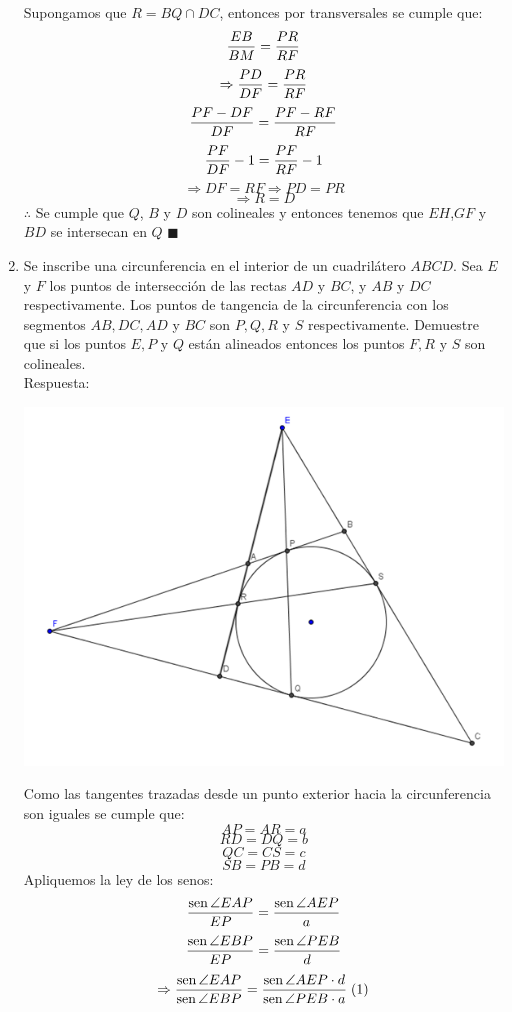 \documentclass{book}
\newcommand{\sen}{\mathop{\rm sen}\nolimits} %
\begin{document}
\begin{enumerate}
          Supongamos que $R=BQ\cap DC$, entonces por transversales se cumple que:
          $${EB\over BM}={PR\over RF}$$
          $$\Rightarrow{PD\over DF}={PR\over RF}$$
          $${PF-DF\over DF}={PF-RF\over RF}$$
          $${PF\over DF}-1={PF\over RF}-1$$
          $$\Rightarrow DF=RF\Rightarrow PD=PR$$
          $$\Rightarrow R=D$$
          $\therefore$ Se cumple que $Q$, $B$ y $D$ son colineales y entonces tenemos que $EH$,$GF$ y $BD$ se intersecan en $Q$ $\blacksquare$\\
    \item Se inscribe una circunferencia en el interior de un cuadrilátero $ABCD$. Sea $E$ y $F$ los puntos de intersección de las rectas $AD$ y $BC$, y $AB$ y $DC$ respectivamente. Los puntos de tangencia de la circunferencia con los segmentos $AB,DC,AD$ y $BC$ son $P,Q,R$ y $S$ respectivamente. Demuestre que si los puntos $E,P$ y $Q$ están alineados entonces los puntos $F,R$ y $S$ son colineales.\\
          Respuesta:
          \begin{center}
              \includegraphics[scale=1]{imagenes/Geometria/15.png}
          \end{center}
          Como las tangentes trazadas desde un punto exterior hacia la circunferencia son iguales se cumple que:
          $$AP=AR=a$$
          $$RD=DQ=b$$
          $$QC=CS=c$$
          $$SB=PB=d$$
          Apliquemos la ley de los senos:
          $${\sen {\angle EAP}\over EP}={\sen {\angle AEP}\over a}$$
          $${\sen {\angle EBP}\over EP}={\sen {\angle PEB}\over d}$$
          $$\Rightarrow\frac{\sen {\angle EAP}}{\sen {\angle EBP}}=\frac{\sen {\angle AEP}\cdot d}{\sen {\angle PEB}\cdot a}\;(1)$$

\end{enumerate}
\end{document}
